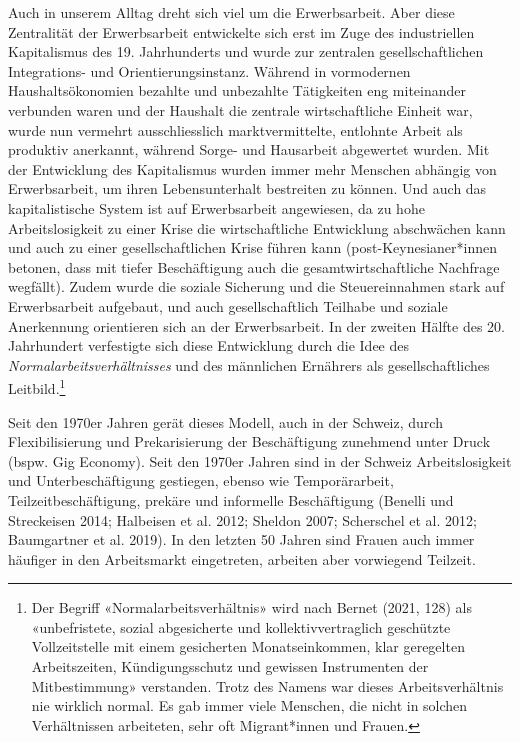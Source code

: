 \documentclass[
  nswissgerman,
  a4paper,
  DIV=11,
  numbers=noendperiod,
  oneside,
  openany]{scrreprt}
\begin{document}
Auch in unserem Alltag dreht sich viel um die Erwerbsarbeit. Aber diese
Zentralität der Erwerbsarbeit entwickelte sich erst im Zuge des
industriellen Kapitalismus des 19. Jahrhunderts und wurde zur zentralen
gesellschaftlichen Integrations- und Orientierungsinstanz. Während in
vormodernen Haushaltsökonomien bezahlte und unbezahlte Tätigkeiten eng
miteinander verbunden waren und der Haushalt die zentrale
wirtschaftliche Einheit war, wurde nun vermehrt ausschliesslich
marktvermittelte, entlohnte Arbeit als produktiv anerkannt, während
Sorge- und Hausarbeit abgewertet wurden. Mit der Entwicklung des
Kapitalismus wurden immer mehr Menschen abhängig von Erwerbsarbeit, um
ihren Lebensunterhalt bestreiten zu können. Und auch das kapitalistische
System ist auf Erwerbsarbeit angewiesen, da zu hohe Arbeitslosigkeit zu
einer Krise die wirtschaftliche Entwicklung abschwächen kann und auch zu
einer gesellschaftlichen Krise führen kann (post-Keynesianer*innen
betonen, dass mit tiefer Beschäftigung auch die gesamtwirtschaftliche
Nachfrage wegfällt). Zudem wurde die soziale Sicherung und die
Steuereinnahmen stark auf Erwerbsarbeit aufgebaut, und auch
gesellschaftlich Teilhabe und soziale Anerkennung orientieren sich an
der Erwerbsarbeit. In der zweiten Hälfte des 20. Jahrhundert verfestigte
sich diese Entwicklung durch die Idee des
\emph{Normalarbeitsverhältnisses} und des männlichen Ernährers als
gesellschaftliches Leitbild.\footnote{Der Begriff
  «Normalarbeitsverhältnis» wird nach Bernet (2021, 128) als
  «unbefristete, sozial abgesicherte und kollektivvertraglich geschützte
  Vollzeitstelle mit einem gesicherten Monatseinkommen, klar geregelten
  Arbeitszeiten, Kündigungsschutz und gewissen Instrumenten der
  Mitbestimmung» verstanden. Trotz des Namens war dieses
  Arbeitsverhältnis nie wirklich normal. Es gab immer viele Menschen,
  die nicht in solchen Verhältnissen arbeiteten, sehr oft Migrant*innen
  und Frauen.}

Seit den 1970er Jahren gerät dieses Modell, auch in der Schweiz, durch
Flexibilisierung und Prekarisierung der Beschäftigung zunehmend unter
Druck (bspw. Gig Economy). Seit den 1970er Jahren sind in der Schweiz
Arbeitslosigkeit und Unterbeschäftigung gestiegen, ebenso wie
Temporärarbeit, Teilzeitbeschäftigung, prekäre und informelle
Beschäftigung (Benelli und Streckeisen 2014; Halbeisen et al. 2012;
Sheldon 2007; Scherschel et al. 2012; Baumgartner et al. 2019). In den
letzten 50 Jahren sind Frauen auch immer häufiger in den Arbeitsmarkt
eingetreten, arbeiten aber vorwiegend Teilzeit.
\end{document}

